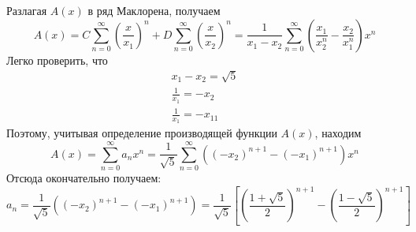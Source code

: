 \begin{task}
\begin{solution}
\begin{equation*}
        \end{equation*}
        Разлагая $A(x)$ в ряд Маклорена, получаем
        \begin{equation*}
            A(x) = C\sum_{n = 0}^{\infty} \left(\frac{x}{x_1}\right)^n + D\sum_{n = 0}^{\infty}\left(\frac{x}{x_2}\right)^n = 
            \frac{1}{x_1 - x_2} \sum_{n = 0}^{\infty}\left(\frac{x_1}{x_2^n} - \frac{x_2}{x_1^n}\right)x^n
        \end{equation*}
        Легко проверить, что 
        \begin{gather*}
            x_1 - x_2 = \sqrt{5} \\
            \frac{1}{x_1} = -x_2 \\
            \frac{1}{x_1} = -x_11
        \end{gather*}
        Поэтому, учитывая определение производящей функции $A(x)$, находим
        \begin{equation*}
            A(x) = \sum_{n = 0}^{\infty} a_n x^n = \frac{1}{\sqrt{5}}\sum_{n = 0}^{\infty}\left((-x_2)^{n+1} - (-x_1)^{n+1}\right)x^n
        \end{equation*}
        Отсюда окончательно получаем:
        \begin{equation*}
            a_n = \frac{1}{\sqrt{5}}\left((-x_2)^{n+1} - (-x_1)^{n+1}\right) = 
            \frac{1}{\sqrt{5}}\left[{\left(\frac{1+\sqrt{5}}{2}\right)}^{n+1} - {\left(\frac{1-\sqrt{5}}{2}\right)}^{n+1}\right]
        \end{equation*}
    \end{solution}
\end{task}

